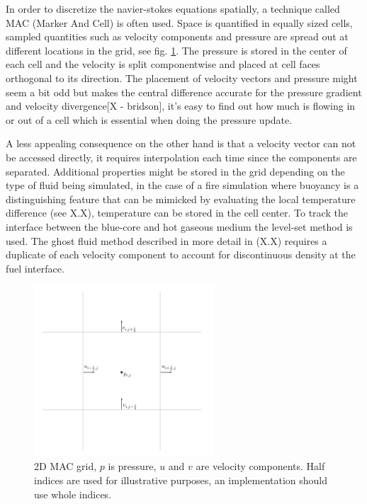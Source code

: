 In order to discretize the navier-stokes equations spatially, a technique called MAC (Marker And Cell) is often used. Space is quantified in equally sized cells, sampled quantities such as velocity components and pressure are spread out at different locations in the grid, see fig. \ref{fig:mac-grid}. The pressure is stored in the center of each cell and the velocity is split componentwise and placed at cell faces orthogonal to its direction. 
The placement of velocity vectors and pressure might seem a bit odd but makes the central difference accurate for the pressure gradient and velocity divergence[X - bridson], it's easy to find out how much is flowing in or out of a cell which is essential when doing the pressure update. 

A less appealing consequence on the other hand is that a velocity vector can not be accessed directly, it requires interpolation each time since the components are separated. Additional properties might be stored in the grid depending on the type of fluid being simulated, in the case of a fire simulation where buoyancy is a distinguishing feature that can be mimicked by evaluating the local temperature difference (see X.X), temperature can be stored in the cell center. To track the interface between the blue-core and hot gaseous medium the level-set method is used. The ghost fluid method described in more detail in (X.X) requires a duplicate of each velocity component to account for discontinuous density at the fuel interface.

\begin{figure}[h!]
\label{fig:mac-grid}
\centering
\includegraphics[width=0.6\textwidth]{mac.png}
\caption{2D MAC grid, $p$ is pressure, $u$ and $v$ are velocity components. Half indices are used for illustrative purposes, an implementation should use whole indices.}
\end{figure}
